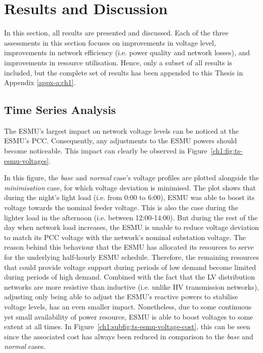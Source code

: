 \section{Results and Discussion}
\label{ch1:sec:results-and-discussion}

In this section, all results are presented and discussed.
Each of the three assessments in this section focuses on improvements in voltage level, improvements in network efficiency (i.e. power quality and network losses), and improvements in resource utilisation.
Hence, only a subset of all results is included, but the complete set of results has been appended to this Thesis in Appendix \ref{appx-a:ch1}.

\subsection{Time Series Analysis}
\label{ch1:subsec:time-series-analysis}

The ESMU's largest impact on network voltage levels can be noticed at the ESMU's PCC.
Consequently, any adjustments to the ESMU powers should become noticeable.
This impact can clearly be observed in Figure~\ref{ch1:fig:ts-esmu-voltages}.



In this figure, the \textit{base} and \textit{normal} case's voltage profiles are plotted alongside the \textit{minimisation} case, for which voltage deviation is minimised.
The plot shows that during the night's light load (i.e. from 0:00 to 6:00), ESMU was able to boost its voltage towards the nominal feeder voltage.
This is also the case during the lighter load in the afternoon (i.e. between 12:00-14:00).
But during the rest of the day when network load increases, the ESMU is unable to reduce voltage deviation to match its PCC voltage with the network's nominal substation voltage.
The reason behind this behaviour that the ESMU has allocated its resources to serve for the underlying half-hourly ESMU schedule.
Therefore, the remaining resources that could provide voltage support during periods of low demand become limited during periods of high demand.
Combined with the fact that the LV distribution networks are more resistive than inductive (i.e. unlike HV transmission networks), adjusting only being able to adjust the ESMU's reactive powers to stabilise voltage levels, has an even smaller impact.
Nonetheless, due to some continuous yet small availability of power resource, ESMU is able to boost voltages to some extent at all times. In Figure~\ref{ch1:subfig:ts-esmu-voltage-cost}, this can be seen since the associated cost has always been reduced in comparison to the \textit{base} and \textit{normal} cases.

